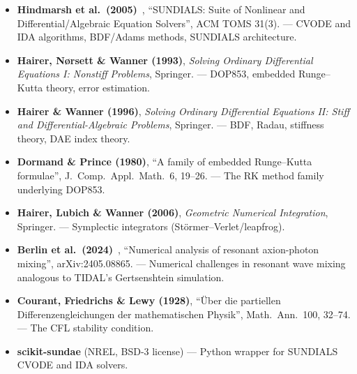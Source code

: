 \begin{itemize}
  \item \textbf{Hindmarsh et al.\ (2005)}~\cite{hindmarsh2005sundials}, ``SUNDIALS: Suite of Nonlinear and
    Differential/Algebraic Equation Solvers'', ACM TOMS 31(3). --- CVODE and
    IDA algorithms, BDF/Adams methods, SUNDIALS architecture.

  \item \textbf{Hairer, N\o rsett \& Wanner (1993)}, \emph{Solving Ordinary Differential
    Equations I: Nonstiff Problems}, Springer. --- DOP853, embedded Runge--Kutta
    theory, error estimation.

  \item \textbf{Hairer \& Wanner (1996)}, \emph{Solving Ordinary Differential Equations II:
    Stiff and Differential-Algebraic Problems}, Springer. --- BDF, Radau,
    stiffness theory, DAE index theory.

  \item \textbf{Dormand \& Prince (1980)}, ``A family of embedded Runge--Kutta formulae'',
    J.\ Comp.\ Appl.\ Math.\ 6, 19--26. --- The RK method family underlying DOP853.

  \item \textbf{Hairer, Lubich \& Wanner (2006)}, \emph{Geometric Numerical Integration},
    Springer. --- Symplectic integrators (St\"ormer--Verlet/leapfrog).

  \item \textbf{Berlin et al.\ (2024)}~\cite{berlin2024axionphoton}, ``Numerical analysis of resonant axion-photon
    mixing'', arXiv:2405.08865. --- Numerical challenges in resonant wave mixing
    analogous to TIDAL's Gertsenshtein simulation.

  \item \textbf{Courant, Friedrichs \& Lewy (1928)}, ``\"Uber die partiellen
    Differenzengleichungen der mathematischen Physik'', Math.\ Ann.\ 100, 32--74.
    --- The CFL stability condition.

  \item \textbf{scikit-sundae} (NREL, BSD-3 license) --- Python wrapper for SUNDIALS
    CVODE and IDA solvers.
\end{itemize}
